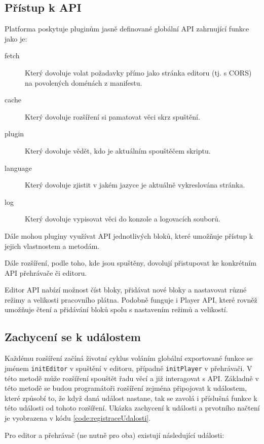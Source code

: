 \subsection{Přístup k API}

Platforma poskytuje pluginům jasně definované globální API zahrnující funkce jako je:

\begin{description}
    \item[fetch] Který dovoluje volat požadavky přímo jako stránka editoru (tj. s CORS) na povolených doménách z manifestu.
    \item[cache] Který dovoluje rozšíření si pamatovat věci skrz spuštění.
    \item[plugin] Který dovoluje vědět, kdo je aktuálním spouštěčem skriptu.
    \item[language] Který dovoluje zjistit v jakém jazyce je aktuálně vykreslována stránka.
    \item[log] Který dovoluje vypisovat věci do konzole a logovacích souborů.
\end{description}

Dále mohou pluginy využívat API jednotlivých bloků, které umožňuje přístup k jejich vlastnostem a metodám.

Dále rozšíření, podle toho, kde jsou spuštěny, dovolují přistupovat ke konkrétním API přehrávače či editoru.

Editor API nabízí možnost číst bloky, přidávat nové bloky a nastavovat různé režimy a velikosti pracovního plátna. Podobně funguje i Player API, které rovněž umožňuje čtení a přidávání bloků spolu s nastavením režimů a velikostí.

\subsection{Zachycení se k událostem}

Každému rozšíření začíná životní cyklus voláním globální exportované funkce se jménem \texttt{initEditor} v spuštění v editoru, případně \texttt{initPlayer} v přehrávači.
V této metodě může rozšíření spouštět řadu věcí a již interagovat s API.
Základně v této metodě se budou programátoři rozšíření zejména připojovat k událostem, které způsobí to, že když daná událost nastane, tak se zavolá i příslušná funkce k této události od tohoto rozšíření. Ukázka zachycení k události a prvotního načtení je vyobrazena v kódu \ref{code:registraceUdalosti}.

Pro editor a přehrávač (ne nutně pro oba) existují následující události:

